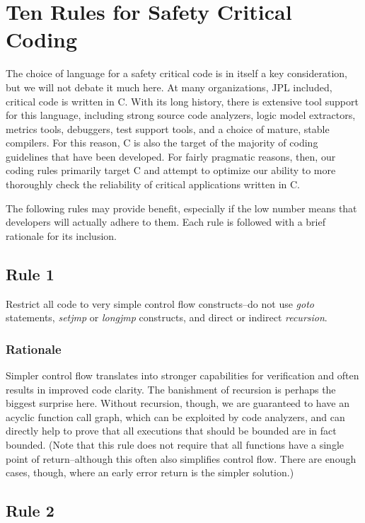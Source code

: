 \documentclass[11pt,oneside]{article}
\begin{document}
\section{Ten Rules for Safety Critical Coding}

The choice of language for a safety critical code is in itself a key
consideration, but we will not debate it much here. At many organizations, JPL
included, critical code is written in C. With its long history, there is
extensive tool support for this language, including strong source code
analyzers, logic model extractors, metrics tools, debuggers, test support
tools, and a choice of mature, stable compilers. For this reason, C is also the
target of the majority of coding guidelines that have been developed. For
fairly pragmatic reasons, then, our coding rules primarily target C and attempt
to optimize our ability to more thoroughly check the reliability of critical
applications written in C.

The following rules may provide benefit, especially if the low number means
that developers will actually adhere to them. Each rule is followed with a
brief rationale for its inclusion.

\subsection{Rule 1}

Restrict all code to very simple control flow constructs--do not use
\emph{goto} statements, \emph{setjmp} or \emph{longjmp} constructs, and direct
or indirect \emph{recursion}.

\subsubsection*{Rationale}

Simpler control flow translates into stronger capabilities for verification and
often results in improved code clarity. The banishment of recursion is perhaps
the biggest surprise here. Without recursion, though, we are guaranteed to have
an acyclic function call graph, which can be exploited by code analyzers, and
can directly help to prove that all executions that should be bounded are in
fact bounded. (Note that this rule does not require that all functions have a
single point of return--although this often also simplifies control flow. There
are enough cases, though, where an early error return is the simpler solution.)

\subsection{Rule 2}
\end{document}

